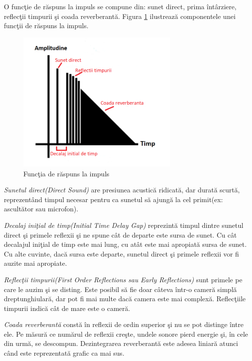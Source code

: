 	O func\c{t}ie de r\u{a}spuns la impuls se compune din: sunet direct, prima \^{i}nt\^{a}rziere, reflec\c{t}ii timpurii \c{s}i coada reverberant\u{a}. Figura \ref{Fig4} ilustreaz\u{a} componentele unei func\c{t}ii de r\u{a}spuns la impuls.
	\bigskip
	
	\begin{figure}[!htb]
		\centering
		\includegraphics[width=8cm]{imagini/impulseResponse.png}
		\caption{Func\c{t}ia de r\u{a}spuns la impuls}
		\label{Fig4}
	\end{figure}

	{\it{Sunetul direct(Direct Sound)}} are presiunea acustic\u{a} ridicat\u{a}, dar durat\u{a} scurt\u{a}, reprezent\^{a}nd timpul necesar pentru ca sunetul s\u{a} ajung\u{a} la cel primit(ex: ascult\u{a}tor sau microfon).
	\bigskip
	
	{\it{Decalaj ini\c{t}ial de timp(Initial Time Delay Gap)}}	reprezint\u{a} timpul dintre sunetul direct \c{s}i primele reflexii \c{s}i ne spune c\^{a}t de departe este sursa de sunet. Cu c\^{a}t decalajul ini\c{t}ial de timp este mai lung, cu at\^{a}t este mai apropiat\u{a} sursa de sunet. Cu alte cuvinte, dac\u{a} sursa este departe, sunetul direct \c{s}i primele reflexii vor fi auzite mai apropiate.
	\bigskip
	
	{\it{Reflec\c{t}ii timpurii(First Order Reflections sau Early Reflections)}} sunt primele pe care le auzim \c{s}i se disting. Este posibil s\u{a} fie doar c\^{a}teva \^{i}ntr-o camer\u{a} simpl\u{a} dreptunghiular\u{a}, dar pot fi mai multe dac\u{a} camera este mai complex\u{a}. Reflec\c{t}iile timpurii indic\u{a} c\^{a}t de mare este o camer\u{a}.
	\bigskip
	
	{\it{Coada reverberant\u{a}}} const\u{a} \^{i}n reflexii de ordin superior \c{s}i nu se pot distinge \^{i}ntre ele. Pe m\u{a}sur\u{a} ce num\u{a}rul de reflexii cre\c{s}te, undele sonore pierd energie \c{s}i, \^{i}n cele din urm\u{a}, se descompun. Dezintegrarea reverberant\u{a} este adesea liniar\u{a} atunci c\^{a}nd este reprezentat\u{a} grafic ca mai sus. 
	
